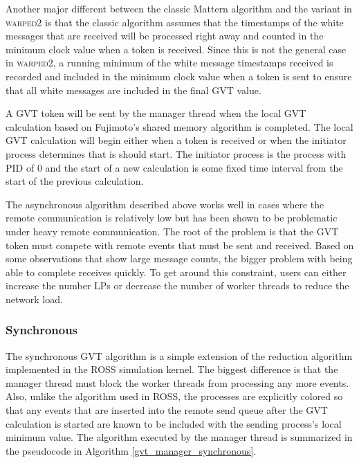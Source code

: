 \documentclass[11pt]{book}
\begin{document}
Another major different between the classic Mattern algorithm and the variant in \textsc{warped2} is
that the classic algorithm assumes that the timestamps of the white messages that are received will
be processed right away and counted in the minimum clock value when a token is received.  Since this
is not the general case in \textsc{warped2}, a running minimum of the white message timestamps
received is recorded and included in the minimum clock value when a token is sent to ensure that all
white messages are included in the final GVT value.

A GVT token will be sent by the manager thread when the local GVT calculation based on Fujimoto's
shared memory algorithm \cite{fujimoto-94} is completed.  The local GVT calculation will begin
either when a token is received or when the initiator process determines that is should start.  The
initiator process is the process with PID of 0 and the start of a new calculation is some fixed time
interval from the start of the previous calculation.

The asynchronous algorithm described above works well in cases where the remote communication is
relatively low but has been shown to be problematic under heavy remote communication.  The root of
the problem is that the GVT token must compete with remote events that must be sent and received.
Based on some observations that show large message counts, the bigger problem with being able to
complete receives quickly.  To get around this constraint, users can either increase the number LPs
or decrease the number of worker threads to reduce the network load.

\subsubsection{Synchronous}

The synchronous GVT algorithm is a simple extension of the reduction algorithm implemented in the
ROSS simulation kernel.  The biggest difference is that the manager thread must block the worker
threads from processing any more events.  Also, unlike the algorithm used in ROSS, the processes are
explicitly colored so that any events that are inserted into the remote send queue after the GVT
calculation is started are known to be included with the sending process's local minimum value.  The
algorithm executed by the manager thread is summarized in the pseudocode in Algorithm
\ref{gvt_manager_synchronous}.
\end{document}
